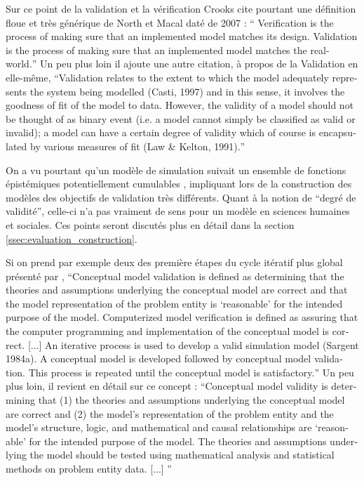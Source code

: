 Sur ce point de la validation et la vérification Crooks cite pourtant une définition floue et très générique de North et Macal daté de 2007 : \foreignquote{english}{ Verification is the process of making sure that an implemented model matches its design. Validation is the process of making sure that an implemented model matches the real-world.} Un peu plus loin il ajoute une autre citation, à propos de la Validation en elle-même, \foreignquote{english}{Validation relates to the extent to which the model adequately represents the system being modelled (Casti, 1997) and in this sense, it involves the goodness of fit of the model to data. However, the validity of a model should not be thought of as binary event (i.e. a model cannot simply be classified as valid or invalid); a model can have a certain degree of validity which of course is encapsulated by various measures of fit (Law \& Kelton, 1991).}

On a vu pourtant qu'un modèle de simulation suivait un ensemble de fonctions épistémiques potentiellement cumulables \autocite{Varenne2013}, impliquant lors de la construction des modèles des objectifs de validation très différents. Quant à la notion de \enquote{degré de validité}, celle-ci n'a pas vraiment de sens pour un modèle en sciences humaines et sociales. Ces points  seront discutés plus en détail dans la section \ref{ssec:evaluation_construction}. 

Si on prend par exemple deux des première étapes du cycle itératif plus global présenté par \textcite{Sargent2010}, \foreignquote{english}{Conceptual model validation is defined as determining that the theories and assumptions underlying the conceptual model are correct and that the model representation of the problem entity is \enquote{reasonable}  for the intended purpose of the model. Computerized model verification is defined as assuring that the computer programming and implementation of the conceptual model is correct. [...] An iterative process is used to develop a valid simulation model (Sargent 1984a). A conceptual model is developed followed by conceptual model validation. This process is repeated until the conceptual model is satisfactory.} Un peu plus loin, il revient en détail sur ce concept : \foreignquote{english}{Conceptual model validity is determining that (1) the theories and assumptions underlying the conceptual model are correct and (2) the model’s representation of the problem entity and the model’s structure, logic, and mathematical and causal relationships are \enquote{reasonable} for the intended purpose of the model. The theories and assumptions underlying the model should be tested using mathematical analysis and statistical methods on problem entity data. [...] }

